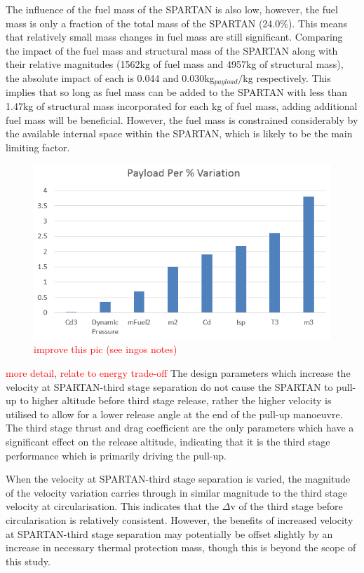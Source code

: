 The influence of the fuel mass of the SPARTAN is also low, however, the fuel mass is only a fraction of the total mass of the SPARTAN (24.0\%). This means that relatively small mass changes in fuel mass are still significant. Comparing the impact of the fuel mass and structural mass of the SPARTAN along with their relative magnitudes (1562kg of fuel mass and 4957kg of structural mass), the absolute impact of each is 0.044 and 0.030kg$_{payload}/$kg respectively. This implies that so long as fuel mass can be added to the SPARTAN with less than 1.47kg of structural mass incorporated for each kg of fuel mass, adding additional fuel mass will be beneficial. However, the fuel mass is constrained considerably by the available internal space within the SPARTAN, which is likely to be the main limiting factor.



\begin{figure}[ht!]
\centering
\includegraphics[width=0.7\linewidth]{figures/5_Ascent/BarChartRelativePayloadChange}
\caption{\textcolor{red}{improve this pic (see ingos notes)}}
\label{fig:BarChartRelativePayloadChange}
\end{figure}


\textcolor{red}{more detail, relate to energy trade-off}
The design parameters which increase the velocity at SPARTAN-third stage separation do not cause the SPARTAN to pull-up to higher altitude before third stage release, rather the higher velocity is utilised to allow for a lower release angle at the end of the pull-up manoeuvre. The third stage thrust and drag coefficient are the only parameters which have a significant effect on the release altitude, indicating that it is the third stage performance which is primarily driving the pull-up. 

When the velocity at SPARTAN-third stage separation is varied, the magnitude of the velocity variation carries through in similar magnitude to the third stage velocity at circularisation. This indicates that the $\Delta$v of the third stage before circularisation is relatively consistent. However, the benefits of increased velocity at SPARTAN-third stage separation may potentially be offset slightly by an increase in necessary thermal protection mass, though this is beyond the scope of this study.




